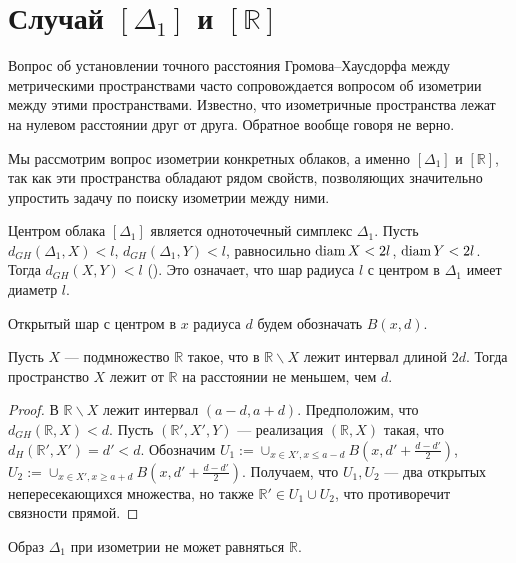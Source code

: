 
\section{Случай $[\Delta_1]$ и $[\mathbb{R}]$}

Вопрос об установлении точного расстояния Громова--Хаусдорфа между метрическими пространствами часто сопровождается вопросом об изометрии между этими пространствами. Известно, что изометричные пространства лежат на нулевом расстоянии друг от друга. Обратное вообще говоря не верно.

Мы рассмотрим вопрос изометрии конкретных облаков, а именно $[\Delta_1]$ и $[\mathbb{R}]$, так как эти пространства обладают рядом свойств, позволяющих значительно упростить задачу по поиску изометрии между ними.

\begin{remark}
	Центром облака $[\Delta_1]$ является одноточечный симплекс $\Delta_1$. Пусть $d_{GH}(\Delta_1, X) < l$, $d_{GH}(\Delta_1, Y) < l$, равносильно $\operatorname{diam} X < 2l$, $\operatorname{diam} Y < 2l$. Тогда $d_{GH}(X,Y) < l$ (\cite{Lectures}). Это означает, что шар радиуса $l$ с центром в $\Delta_1$ имеет диаметр $l$. 
\end{remark}

Открытый шар с центром в $x$ радиуса $d$ будем обозначать $B(x,d)$.
\begin{lemma}
	Пусть $X$ --- подмножество $\mathbb{R}$ такое, что в $\mathbb{R} \backslash X$ лежит интервал длиной $2d$. Тогда пространство $X$ лежит от $\mathbb{R}$ на расстоянии не меньшем, чем $d$.
\end{lemma}

\begin{proof}
	В $\mathbb{R} \backslash X$ лежит интервал $(a-d,a+d)$. Предположим, что $d_{GH}(\mathbb{R}, X) < d$. Пусть $(\mathbb{R}', X', Y)$ --- реализация $(\mathbb{R}, X)$ такая, что $d_H(\mathbb{R}', X') = d' < d$. Обозначим $U_1 := \cup_{x \in X', x \le a-d}B(x, d'+\frac{d-d'}{2})$, $U_2 := \cup_{x \in X', x \ge a+d}B(x, d'+\frac{d-d'}{2})$. Получаем, что $U_1, U_2$ --- два открытых непересекающихся множества, но также $\mathbb{R}' \in U_1\cup U_2$, что противоречит связности прямой.
\end{proof}

\begin{theorem}
	Образ $\Delta_1$ при изометрии не может равняться $\mathbb{R}$.
\end{theorem} 

